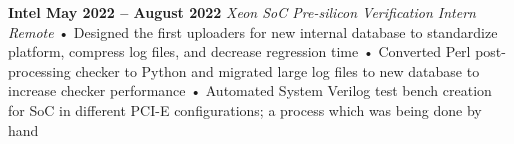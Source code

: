 \documentclass[../main.tex]{subfiles}
\begin{document}
%
\noindent\textbf{{\fontsize{\textFontSize}{\textFontBox}\selectfont Intel \hfill May 2022 – August 2022}}
\vspace{\jobHeaderDist}\newline
%
{\fontsize{\textFontSize}{\textFontBox}\selectfont\emph{Xeon SoC Pre-silicon Verification Intern \hfill Remote \hspace{0 cm}}}
\newline
%
%
{\fontsize{\textFontSize}{\textFontBox}\selectfont • \hspace{1mm} Designed the first uploaders for new internal database to standardize platform, compress log files, and decrease regression time }\newline
{\fontsize{\textFontSize}{\textFontBox}\selectfont • \hspace{1mm} Converted Perl post-processing checker to Python and migrated large log files to new database to increase checker performance }\newline
{\fontsize{\textFontSize}{\textFontBox}\selectfont • \hspace{1mm} Automated System Verilog test bench creation for SoC in different PCI-E configurations; a process which was being done by hand }\vspace{-3mm}\newline
%
%
\end{document}
